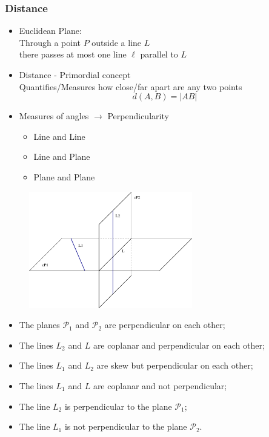 \begin{frame}
 \frametitle{Distance}

\begin{itemize}
 \item Euclidean Plane: \\
    Through a point $P$ outside a line $L$\\ there passes at most one line $\ell$ parallel to $L$
  \item<2-> Distance - Primordial concept \\
      Quantifies/Measures how close/far apart are any two points \\
      $$d(A,B) = |AB|$$
  \item<3-> Measures of angles $\to$ Perpendicularity
      \begin{itemize}
	\item Line and Line
        \item Line and Plane
        \item Plane and Plane
      \end{itemize}
  \end{itemize}

\end{frame}

\begin{frame}
%
\begin{figure}[h]
  \includegraphics[height=2in]{../images/perpendicularity.eps}
  \label{fig:perpendicularity}
\end{figure}
%
\begin{itemize}
%
\item The planes $\mathcal{P}_1$ and $\mathcal{P}_2$ are perpendicular on each other;
%
\item The lines $L_2$ and $L$ are coplanar and perpendicular on each other;
%
\item The lines $L_1$ and $L_2$ are skew but perpendicular on each other;
%
\item The lines $L_1$ and $L$ are coplanar and not perpendicular;
%
\item The line $L_2$ is perpendicular to the plane $\mathcal{P}_1$;
%
\item The line $L_1$ is not perpendicular to the plane $\mathcal{P}_2$.
\end{itemize}

\end{frame}

